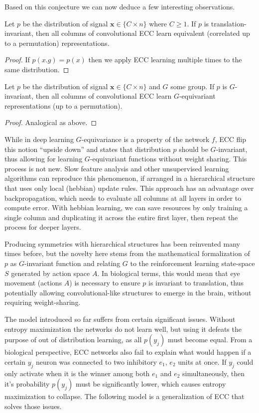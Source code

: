 \documentclass[oneside,english,logo]{amuthesis}
\begin{document}
Based on this conjecture we can now deduce a few interesting observations.
\begin{theorem}
Let $p$ be the distribution of signal $\boldsymbol{x} \in \{C \times n\}$ where $C\ge 1$. If $p$ is translation-invariant, then all columns of convolutional ECC learn equivalent (correlated up to a permutation) representations. 
\end{theorem}
\begin{proof}
If $p(x.g)=p(x)$ then  we apply ECC learning multiple times to the same distribution.
\end{proof}
\begin{theorem}
	Let $p$ be the distribution of signal $\boldsymbol{x} \in \{C\times n\}$ and $G$ some group. If $p$ is $G$-invariant, then all columns of convolutional ECC learn $G$-equivariant representations (up to a permutation).
\end{theorem}
\begin{proof}
Analogical as above.
\end{proof}

While in deep learning $G$-equivariance is a property of the network $f$, ECC flip this notion ``upside down'' and states that distribution $p$ should be $G$-invariant, thus allowing for learning $G$-equivariant functions without weight sharing. This process is not new. Slow feature analysis and other unsupervised learning algorithms can reproduce this phenomenon, if arranged in a hierarchical structure that uses only local (hebbian) update rules. This approach has an advantage over backpropagation, which needs to evaluate all columns at all layers in order to compute error. With hebbian learning, we can save resources by only training a single column and  duplicating it across the entire first layer, then repeat the process for deeper layers.

Producing symmetries with hierarchical structures has been reinvented many times before, but the novelty here stems from the mathematical formalization of $p$ as $G$-invariant function and relating $G$ to the reinforcement learning state-space $S$ generated by action space $A$. In biological terms, this would mean that eye movement (actions $A$) is necessary to ensure $p$ is invariant to translation, thus potentially allowing convolutional-like structures to emerge in the brain, without requiring weight-sharing.

The model introduced so far suffers from certain significant issues. Without entropy maximization the networks do not learn well, but using it defeats the purpose of out of distribution learning, as all $p(y_j)$ must become equal. From a biological perspective, ECC networks also fail to explain what would happen if a certain $y_j$ neuron was connected to two inhibitory $e_1$, $e_2$ units at once. If $y_j$  could only activate when it is the winner among both $e_1$ and $e_2$ simultaneously, then it's probability $p(y_j)$ must be significantly lower, which causes entropy maximization to collapse. The following model is a generalization of ECC that solves those issues.
\end{document}
